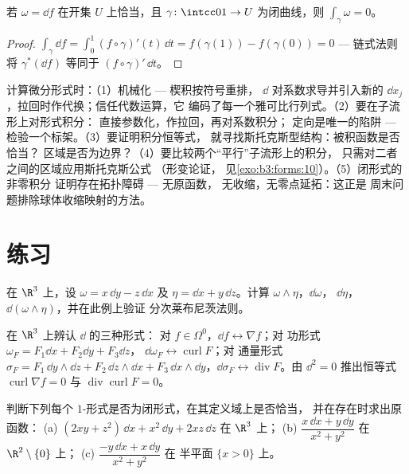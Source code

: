 \begin{proposition}\label{prop:b3:forms:exactloop}
若 $\omega = \dd f$ 在开集 $U$ 上恰当，且
$\gamma\colon\intcc01\to U$ 为闭曲线，则
$\int_\gamma\omega = 0$。
\end{proposition}

\begin{proof}
$\int_\gamma\dd f = \int_0^1(f\circ\gamma)'(t)\,\dd t =
f(\gamma(1)) - f(\gamma(0)) = 0$ --- 链式法则
将 $\gamma^*(\dd f)$ 等同于 $(f\circ\gamma)'\,\dd t$。
\end{proof}

\begin{method}\label{met:b3:forms:method}
计算微分形式时：（1）机械化 --- 楔积按符号重排，
$\dd$ 对系数求导并引入新的 $\dd
x_j$，拉回时作代换；信任代数运算，它
编码了每一个雅可比行列式。（2）要在子流形上对形式积分：
直接参数化，作拉回，再对系数积分；
定向是唯一的陷阱 --- 检验一个标架。（3）要证明积分恒等式，
就寻找斯托克斯型结构：被积函数是否恰当？
区域是否为边界？（4）要比较两个“平行”子流形上的积分，
只需对二者之间的区域应用斯托克斯公式
（形变论证，
见\cref{exo:b3:forms:10}）。（5）闭形式的非零积分
证明存在拓扑障碍 --- 无原函数，
无收缩，无零点延拓：这正是
周末问题排除球体收缩映射的方法。
\end{method}

\section{练习}

\begin{exercise}[$\star$]\label{exo:b3:forms:1}
在 $\R^3$ 上，设 $\omega = x\,\dd y - z\,\dd x$ 及 $\eta =
\dd x + y\,\dd z$。计算 $\omega\wedge\eta$，$\dd\omega$，
$\dd\eta$，$\dd(\omega\wedge\eta)$，并在此例上验证
分次莱布尼茨法则。
\end{exercise}

\begin{exercise}[$\star$]\label{exo:b3:forms:2}
在 $\R^3$ 上辨认 $\dd$ 的三种形式：
对 $f \in \Omega^0$，$\dd f \leftrightarrow \nabla f$；对
功形式 $\omega_F = F_1\dd x + F_2\dd y + F_3\dd z$，
$\dd\omega_F \leftrightarrow \operatorname{curl}F$；对
通量形式 $\sigma_F = F_1\,\dd y\wedge\dd z + F_2\,\dd
z\wedge\dd x + F_3\,\dd x\wedge\dd y$，$\dd\sigma_F
\leftrightarrow \operatorname{div}F$。由 $\dd^2 =
0$ 推出恒等式 $\operatorname{curl}\nabla f = 0$ 与
$\operatorname{div}\operatorname{curl}F = 0$。
\end{exercise}

\begin{exercise}[$\star\star$]\label{exo:b3:forms:3}
判断下列每个 $1$-形式是否为闭形式，在其定义域上是否恰当，
并在存在时求出原函数：
(a) $(2xy + z^2)\,\dd x + x^2\,\dd y + 2xz\,\dd z$ 在
$\R^3$ 上；
(b) $\dfrac{x\,\dd x + y\,\dd y}{x^2 + y^2}$ 在
$\R^2\setminus\{0\}$ 上；
(c) $\dfrac{-y\,\dd x + x\,\dd y}{x^2 + y^2}$ 在
半平面 $\{x > 0\}$ 上。
\end{exercise}

